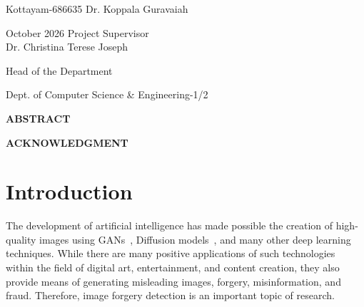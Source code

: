 \documentclass[12pt,a4wide]{report}
\theoremstyle{plain}
\theoremstyle{definition}
\theoremstyle{remark}
\begin{document}
\vspace{4cm}

\noindent Kottayam-686635  \hfill Dr. Koppala Guravaiah

\noindent October 2026 \hfill Project Supervisor\\

\vspace{2.5cm}
\noindent\hfill\hfill Dr. Christina Terese Joseph

\noindent \hfill Head of the Department

\noindent\hfill\hfill Dept. of Computer Science \& Engineering-1/2\\

\clearpage




\begin{center}
{\Large{\bf{ABSTRACT}}}
\end{center}



\clearpage

\begin{center}
{\large{\bf{ACKNOWLEDGMENT}}}
\end{center}




\clearpage

\tableofcontents
\clearpage

\listoffigures
\clearpage

\listoftables
\clearpage


\newpage

\setcounter{page}{1}










\chapter{Introduction}
\label{ch:intro}

The development of artificial intelligence has made possible the creation of high-quality images using GANs~\cite{goodfellow2014gan}, Diffusion models~\cite{ho2020ddpm, rombach2022ldm}, and many other deep learning techniques. While there are many positive applications of such technologies within the field of digital art, entertainment, and content creation, they also provide means of generating misleading images, forgery, misinformation, and fraud. Therefore, image forgery detection is an important topic of research.
\end{document}
